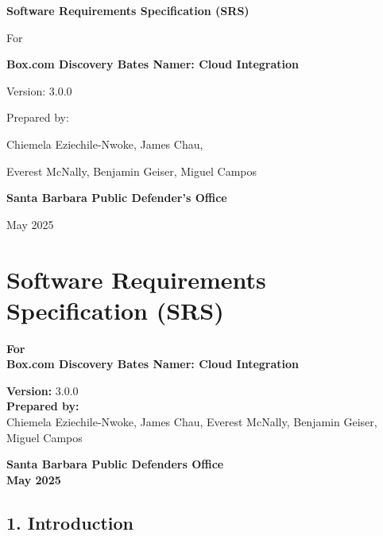 \documentclass[
]{article}
\author{}
\date{}
\begin{document}
\begin{titlepage}
    \centering
    {\LARGE\textbf{Software Requirements Specification (SRS)}\par}
    \vspace{1cm}
    {\Large For\par}
    \vspace{0.5cm}
    {\Large\textbf{Box.com Discovery Bates Namer: Cloud Integration}\par}
    \vspace{1.5cm}
    {\large Version: 3.0.0\par}
    \vspace{1.5cm}
    Prepared by:\par
    Chiemela Eziechile-Nwoke, James Chau,\par 
    Everest McNally, Benjamin Geiser, Miguel Campos\par
    \vspace{1.5cm}
    \textbf{Santa Barbara Public Defender's Office}\par
    \vspace{0.5cm}
    May 2025\par
    \vfill
\end{titlepage}

\tableofcontents
\newpage
\hypertarget{software-requirements-specification-srs}{%
\section{\texorpdfstring{\textbf{Software Requirements Specification
(SRS)}}{Software Requirements Specification (SRS)}}\label{software-requirements-specification-srs}}

\textbf{For}\\
\textbf{Box.com Discovery Bates Namer: Cloud Integration}

\textbf{Version:} 3.0.0\\
\textbf{Prepared by:}\\
Chiemela Eziechile-Nwoke, James Chau, Everest McNally, Benjamin Geiser,
Miguel Campos

\textbf{Santa Barbara Public Defender\textquotesingle s Office}\\
\textbf{May 2025}

\hypertarget{introduction}{%
\subsection{\texorpdfstring{\textbf{1.
Introduction}}{1. Introduction}}\label{introduction}}
\end{document}
